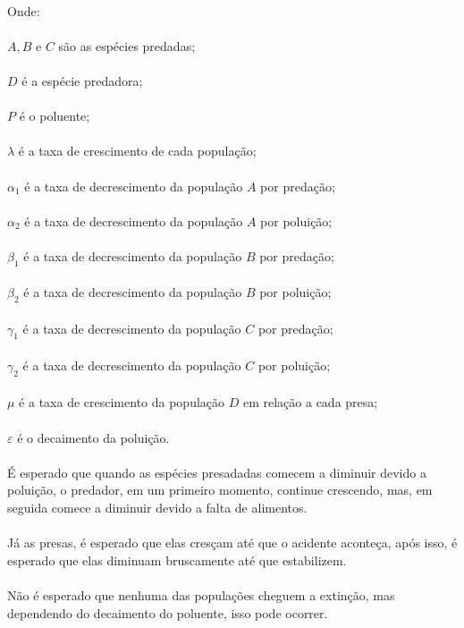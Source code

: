 \documentclass[a4paper]{article}
\begin{document}
\\
Onde:
\\
\\
$A, B$ e $C$ s\~ao as esp\'ecies predadas;
\\
\\
$D$ \'e a esp\'ecie predadora;
\\
\\
$P$ \'e o poluente;
\\
\\
$\lambda$ \'e a taxa de crescimento de cada popula\c{c}\~ao;
\\
\\
$\alpha_1$ \'e a taxa de decrescimento da popula\c{c}\~ao $A$ por preda\c{c}\~ao;
\\
\\
$\alpha_2$ \'e a taxa de decrescimento da popula\c{c}\~ao $A$ por polui\c{c}\~ao;
\\
\\
$\beta_1$ \'e a taxa de decrescimento da popula\c{c}\~ao $B$ por preda\c{c}\~ao;
\\
\\
$\beta_2$ \'e a taxa de decrescimento da popula\c{c}\~ao $B$ por polui\c{c}\~ao;
\\
\\
$\gamma_1$ \'e a taxa de decrescimento da popula\c{c}\~ao $C$ por preda\c{c}\~ao;
\\
\\
$\gamma_2$ \'e a taxa de decrescimento da popula\c{c}\~ao $C$ por polui\c{c}\~ao;
\\
\\
$\mu$ \'e a taxa de crescimento da popula\c{c}\~ao $D$ em rela\c{c}\~ao a cada presa;
\\
\\
$\varepsilon$ \'e o decaimento da polui\c{c}\~ao.
\\
\\
\'E esperado que quando as esp\'ecies presadadas comecem a diminuir devido a polui\c{c}\~ao, o predador, em um primeiro momento, continue crescendo, mas, em seguida comece a diminuir devido a falta de alimentos.
\\
\\
J\'a as presas, \'e esperado que elas cres\c{c}am at\'e que o acidente aconte\c{c}a, ap\'os isso, \'e esperado que elas diminuam bruscamente at\'e que estabilizem.
\\
\\
N\~ao \'e esperado que nenhuma das popula\c{c}\~oes cheguem a extin\c{c}\~ao, mas dependendo do decaimento do poluente, isso pode ocorrer.
\\
\\
\end{document}
